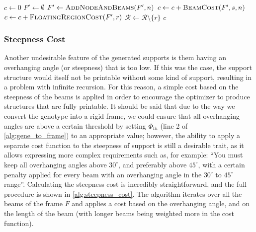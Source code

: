 \begin{algorithm}[ht]
\begin{algorithmic}[1]
    \Statex

        \State $c \gets 0$
        \State $F' \gets \emptyset$ 
         
            \State $F' \gets \Call{AddNodeAndBeams}{F', n}$ 
             
                \State $c \gets c + \Call{BeamCost}{F', s, n}$ 
            \EndFor
             
                \State $c \gets c + \Call{FloatingRegionCost}{F', r}$ 
                \State $\mathcal{R} \gets \mathcal{R} \setminus \{r\}$ 
            \EndFor
        \EndFor
        \State \Return $c$
    \EndProcedure
\end{algorithmic}
\label{alg:stiffness_cost}
\end{algorithm}
\FloatBarrier


\subsubsection{Steepness Cost}

Another undesirable feature of the generated supports is them having
an overhanging angle (or steepness) that is too low. If this was the case,
the support structure would itself not be printable without
some kind of support, resulting in a problem with infinite recursion.
For this reason, a simple cost based on the steepness of the
beams is applied in order to encourage the optimizer to produce structures
that are fully printable.
It should be said that due to the way we convert the genotype into a rigid
frame, we could ensure that all overhanging angles are above a certain threshold
by setting $\varPhi_{{th}}$ (line 2 of \cref{alg:gene_to_frame})
to an appropriate value; however, the ability to apply a separate cost function
to the steepness of support is still a desirable trait, as it allows
expressing more complex requirements such as, for example: ``You must keep all overhanging
angles above $30^\circ$, and preferably above $45^\circ$, with a certain penalty
applied for every beam with an overhanging angle in the $30^\circ$ to
$45^\circ$ range''.
Calculating the steepness cost is incredibly straightforward,
and the full procedure is shown in \cref{alg:steepness_cost}.
The algorithm iterates over all the beams of the frame $F$ and applies a cost 
based on the overhanging angle, and on the length of the beam (with
longer beams being weighted more in the cost function).

